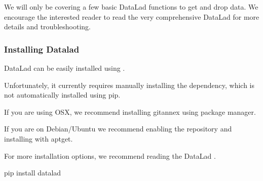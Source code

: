 \documentclass[letterpaper,10pt,english]{sphinxmanual}
\begin{document}
We will only be covering a few basic DataLad functions to get and drop data. We encourage the interested reader to read the very comprehensive DataLad  for more details and troubleshooting.


\subsubsection{Installing Datalad}
\label{\detokenize{content/Download_Data:installing-datalad}}
DataLad can be easily installed using .


Unfortunately, it currently requires manually installing the  dependency, which is not automatically installed using pip.

If you are using OSX, we recommend installing git\sphinxhyphen{}annex using  package manager.


If you are on Debian/Ubuntu we recommend enabling the  repository and installing with apt\sphinxhyphen{}get.


For more installation options, we recommend reading the DataLad .

\begin{sphinxVerbatim}[commandchars=\\\{\}]
pip install datalad
\end{sphinxVerbatim}
\end{document}
